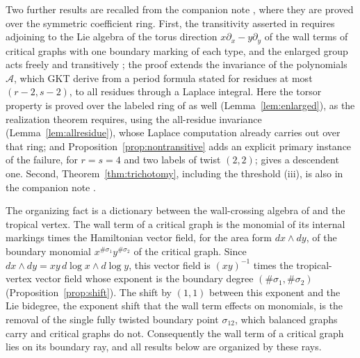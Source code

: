 \documentclass[11pt]{amsart}
\theoremstyle{definition}
\theoremstyle{remark}
\newcommand{\Ascr}{\mathcal{A}}
\begin{document}
Two further results are recalled from the companion note \cite{note}, where
they are proved over the symmetric coefficient ring.  First, the transitivity
asserted in \cite[Thm.~4.27]{GKT} requires adjoining to the Lie algebra of
\cite[Def.~4.23]{GKT} the torus direction $x\partial_x-y\partial_y$ of the
wall terms of critical graphs with one boundary marking of each type, and the
enlarged group acts freely and transitively \cite[Prop.~1.4 and
Rem.~3.1]{note}; the proof extends the invariance of the polynomials $\Ascr$,
which GKT derive from a period formula stated for residues at most
$(r-2,s-2)$, to all residues through a Laplace integral.  Here the torsor property is proved over the labeled ring of \cite[Def.~4.6]{GKT} as well (Lemma~\ref{lem:enlarged}), as the realization theorem requires, using the all-residue invariance (Lemma~\ref{lem:allresidue}), whose Laplace computation \cite[proof of Prop.~1.4]{note} already carries out over that ring; and
Proposition~\ref{prop:nontransitive} adds an explicit primary instance of the
failure, for $r=s=4$ and two labels of twist $(2,2)$; \cite[Ex.~3.2]{note}
gives a descendent one.  Second, Theorem~\ref{thm:trichotomy}, including the
threshold (iii), is also in the companion note \cite[\S2, Lem.~4.2 and
Prop.~7.1]{note}.

The organizing fact is a dictionary between the wall-crossing algebra of
\cite{GKT} and the tropical vertex.  The wall term of a critical graph is the
monomial of its internal markings times the Hamiltonian vector field, for the
area form $dx\wedge dy$, of the boundary monomial $x^{\#\sigma_1}y^{\#\sigma_2}$
of the critical graph.  Since $dx\wedge dy=xy\,d\log x\wedge d\log y$, this
vector field is $(xy)^{-1}$ times the tropical-vertex vector field whose
exponent is the boundary degree
$(\#\sigma_1,\#\sigma_2)$ (Proposition~\ref{prop:shift}).  The shift
by $(1,1)$ between this exponent and the Lie bidegree, the exponent shift that
the wall term effects on monomials, is the removal of the
single fully twisted boundary point $\sigma_{12}$, which balanced graphs carry
and critical graphs do not.  Consequently the wall term of a critical graph lies
on its boundary ray, and all results below are organized by these rays.
\end{document}
